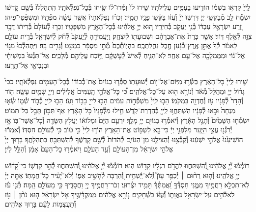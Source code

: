\documentclass[twoside, openany, parskip=half, 11pt]{book}
\begin{document}
\begin{narrow}
לַֽייָ֙ קִרְא֣וּ בִשְׁמ֔וֹ
הוֹדִ֥יעוּ בָעַמִּ֖ים עֲלִילֹתָֽיו׃
שִׁ֤ירוּ לוֹ֙ זַמְּ֯רוּ־ל֔וֹ שִׂ֖יחוּ בְּ֯כׇל־נִפְלְ֯אֹתָֽיו׃
הִֽתְהַלְלוּ֙ בְּ֯שֵׁ֣ם קׇדְשׁ֔וֹ יִשְׂמַ֕ח לֵ֖ב מְ֯בַקְשֵׁ֥י יְיָ׃
דִּרְשׁ֤וּ יְיָ֙ וְ֯עֻזּ֔וֹ בַּקְּ֯שׁ֥וּ פָנָ֖יו תָּמִֽיד׃
זִכְר֗וּ נִפְלְ֯אֹתָיו֙ אֲשֶׁ֣ר עָשָׂ֔ה מֹפְ֯תָ֖יו וּמִשְׁפְּ֯טֵי־פִֽיהוּ׃
זֶ֚רַע יִשְׂרָאֵ֣ל עַבְדּ֔וֹ בְּ֯נֵ֥י יַעֲקֹ֖ב בְּ֯חִירָֽיו׃
ה֚וּא יְיָ֣ אֱלֹהֵ֔ינוּ בְּ֯כׇל־הָאָ֖רֶץ מִשְׁפָּטָֽיו׃
זִכְר֤וּ לְ֯עוֹלָם֙ בְּ֯רִית֔וֹ דָּבָ֥ר צִוָּ֖ה לְ֯אֶ֥לֶף דּֽוֹר׃
אֲשֶׁ֤ר כָּרַת֙ אֶת־אַבְרָהָ֔ם וּשְׁבוּעָת֖וֹ לְ֯יִצְחָֽק׃
וַיַּעֲמִידֶ֤הָ לְ֯יַֽעֲקֹב֙ לְ֯חֹ֔ק לְ֯יִשְׂרָאֵ֖ל בְּ֯רִ֥ית עוֹלָֽם׃
לֵאמֹ֗ר לְ֯ךָ֙ אֶתֵּ֣ן אֶֽרֶץ־כְּ֯נָ֔עַן חֶ֖בֶל נַחֲלַתְכֶֽם׃
בִּהְיֽוֹתְ֯כֶם֙ מְ֯תֵ֣י מִסְפָּ֔ר כִּמְעַ֖ט וְ֯גָרִ֥ים בָּֽהּ׃
וַיִּֽתְהַלְּ֯כוּ֙ מִגּ֣וֹי אֶל־גּ֔וֹי וּמִמַּמְלָכָ֖ה אֶל־עַ֥ם אַחֵֽר׃
לֹֽא־הִנִּ֤יחַ לְ֯אִישׁ֙ לְ֯עׇשְׁקָ֔ם וַיּ֥וֹכַח עֲלֵיהֶ֖ם מְ֯לָכִֽים׃
אַֽל־תִּגְּ֯עוּ֙ בִּמְשִׁיחָ֔י וּבִנְבִיאַ֖י אַל־תָּרֵֽעוּ׃

שִׁ֤ירוּ לַֽייָ֙ כׇּל־הָאָ֔רֶץ בַּשְּׂ֯ר֥וּ מִיּֽוֹם־אֶל־י֖וֹם יְ֯שׁוּעָתֽוֹ׃
סַפְּ֯ר֤וּ בַגּוֹיִם֙ אֶת־כְּ֯בוֹד֔וֹ בְּ֯כׇל־הָעַמִּ֖ים נִפְלְ֯אֹתָֽיו׃
ככִּי֩ גָד֨וֹל יְיָ֤ וּמְהֻלָּל֙ מְ֯אֹ֔ד וְ֯נוֹרָ֥א ה֖וּא עַל־כׇּל־אֱלֹהִֽים׃
כִּ֠י כׇּל־אֱלֹהֵ֤י הָֽעַמִּים֙ אֱלִילִ֔ים וַייָ֖ שָׁמַ֥יִם עָשָֽׂה׃
ה֤וֹד וְ֯הָדָר֙ לְ֯פָנָ֔יו עֹ֥ז וְ֯חֶדְוָ֖ה בִּמְקֹמֽוֹ׃
הָב֤וּ לַֽייָ֙ מִשְׁפְּ֯ח֣וֹת עַמִּ֔ים הָב֥וּ לַייָ֖ כָּב֥וֹד וָעֹֽז׃
הָב֥וּ לַֽייָ֖ כְּ֯ב֣וֹד שְׁ֯מ֑וֹ שְׂ֯א֤וּ מִנְחָה֙ וּבֹ֣אוּ לְ֯פָנָ֔יו
הִשְׁתַּחֲו֥וּ לַֽייָ֖ בְּ֯הַדְרַת־קֹֽדֶשׁ׃ חִ֤ילוּ מִלְּ֯פָנָיו֙ כׇּל־הָאָ֔רֶץ
אַף־תִּכּ֥וֹן תֵּבֵ֖ל בַּל־תִּמּֽוֹט׃ יִשְׂמְ֯ח֤וּ הַשָּׁמַ֙יִם֙ וְ֯תָגֵ֣ל הָאָ֔רֶץ
וְ֯יֹאמְ֯ר֥וּ בַגּוֹיִ֖ם יְיָ֥ מָלָֽךְ׃ יִרְעַ֤ם הַיָּם֙ וּמְלוֹא֔וֹ
יַעֲלֹ֥ץ הַשָּׂדֶ֖ה וְ֯כׇל־אֲשֶׁר־בּֽוֹ׃ אָ֥ז יְ֯רַנְּ֯נ֖וּ עֲצֵ֣י הַיָּ֑עַר
מִלִּפְנֵ֣י יְיָ֔ כִּי־בָ֖א לִשְׁפּ֥וֹט אֶת־הָאָֽרֶץ׃ הוֹד֤וּ לַֽייָ֙ כִּ֣י ט֔וֹב
כִּ֥י לְ֯עוֹלָ֖ם חַסְדּֽוֹ׃ וְ֯אִמְר֕וּ הוֹשִׁיעֵ֙נוּ֙ אֱלֹהֵ֣י יִשְׁעֵ֔נוּ
וְ֯קַבְּ֯צֵ֥נוּ וְ֯הַצִּילֵ֖נוּ מִן־הַגּוֹיִ֑ם לְ֯הֹדוֹת֙ לְ֯שֵׁ֣ם קׇדְשֶׁ֔ךָ
לְ֯הִשְׁתַּבֵּ֖חַ בִּתְהִלָּתֶֽךָ׃ בָּר֤וּךְ יְיָ֙ אֱלֹהֵ֣י יִשְׂרָאֵ֔ל
מִן־הָעוֹלָ֖ם וְ֯עַ֣ד הָעֹלָ֑ם וַיֹּאמְ֯ר֤וּ כׇל־הָעָם֙ אָמֵ֔ן וְ֯הַלֵּ֖ל לַייָ׃
\end{narrow}

\newcommand{\negline}{\vspace{-\baselineskip}}

\negline

%
רוֹמְ֯מ֡וּ יְ֘יָ֤ אֱלֹהֵ֗ינוּ וְֽ֭֯הִשְׁתַּחֲווּ לַהֲדֹ֥ם רַגְלָ֗יו קָד֥וֹשׁ הֽוּא׃
רוֹמְ֯מ֡וּ יְ֘יָ֤ אֱלֹהֵ֗ינוּ וְֽ֭֯הִשְׁתַּחֲווּ לְ֯הַ֣ר קׇדְשׁ֑וֹ כִּי־קָ֝ד֗וֹשׁ יְיָ֥ אֱלֹהֵֽינוּ׃
%
וְ֯ה֤וּא רַח֨וּם ׀ יְ֯כַפֵּ֥ר עָוֺן֮ וְֽ֯לֹא־יַֽ֫שְׁחִ֥ית וְ֭֯הִרְבָּה לְ֯הָשִׁ֣יב אַפּ֑וֹ
וְ֯לֹא־יָ֝עִ֗יר כׇּל־חֲמָתֽוֹ׃
%
אַתָּ֤ה יְיָ֗ לֹֽא־תִכְלָ֣א רַחֲמֶ֣יךָ מִמֶּ֑נִּי חַסְדְּ֯ךָ֥ וַ֝אֲמִתְּ֯ךָ֗ תָּמִ֥יד יִצְּ֯רֽוּנִי׃
זְכֹר־רַחֲמֶ֣יךָ יְיָ֭ וַחֲסָדֶ֑יךָ כִּ֖י מֵעוֹלָ֣ם הֵֽמָּה׃
תְּ֯נ֥וּ עֹ֗ז לֵאלֹ֫הִ֥ים עַֽל־יִשְׂרָאֵ֥ל גַּאֲוָת֑וֹ וְ֯֝עֻזּ֗וֹ בַּשְּׁ֯חָקִֽים׃
נ֤וֹרָ֥א אֱלֹהִ֗ים מִֽמִּקְדָּ֫שֶׁ֥יךָ אֵ֤ל יִשְׂרָאֵ֗ל
ה֤וּא נֹתֵ֨ן ׀ עֹ֖ז וְ֯תַעֲצֻמ֥וֹת לָעָ֗ם בָּר֥וּךְ אֱלֹהִֽים׃
\end{document}
